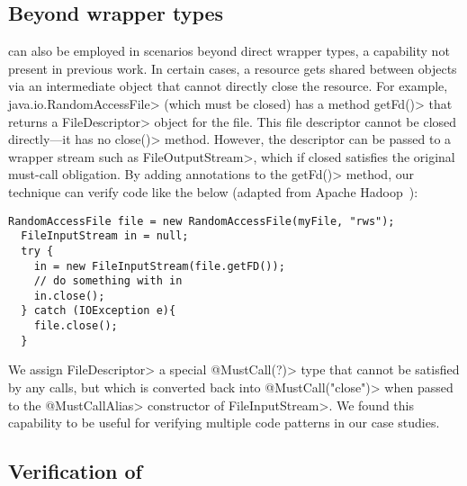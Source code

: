 
\subsection{Beyond wrapper types}

\mccannot can also be employed in scenarios beyond direct wrapper types, a
capability not present in previous work.  In certain cases, a resource gets
shared between objects via an intermediate object that cannot directly close the
resource.  For example, \<java.io.RandomAccessFile> (which must be closed) has
a method \<getFd()> that returns a \<FileDescriptor>
object for the file. This file
descriptor cannot be closed directly---it has no \<close()> method.
However, the descriptor can be passed to a wrapper stream such as
\<FileOutputStream>, which if closed satisfies the original must-call
obligation.  By adding \mccannot annotations to the \<getFd()> method, our
technique can verify code like the below (adapted from Apache Hadoop~\cite{hadoop-random-access-file}):
\begin{lstlisting}[frame=tb,belowskip=3mm]
  RandomAccessFile file = new RandomAccessFile(myFile, "rws");
  FileInputStream in = null;
  try {
    in = new FileInputStream(file.getFD());
    // do something with in  
    in.close();
  } catch (IOException e){
    file.close();
  }
\end{lstlisting}
We assign \<FileDescriptor> a special \<@MustCall(?)> type that cannot be satisfied by any calls,
but which is converted back into \<@MustCall("close")> when passed to the \<@MustCallAlias> constructor
of \<FileInputStream>. We found this capability to be
useful for verifying multiple code patterns in our case studies.

\subsection{Verification of \mccannot}

